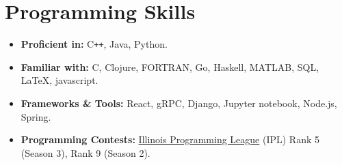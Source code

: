 \documentclass[11pt,a4paper,sans]{moderncv}        %
\begin{document}
\vspace{-5pt}
\section{Programming Skills}
\vspace{-5pt}
\begin{itemize}
	\item \textbf{Proficient in:}
	      C\texttt{++}, 
	      Java,
	      Python.
	\item \textbf{Familiar with:}
	      C,
	      Clojure,
	      FORTRAN,
	      Go,
	      Haskell,
	      MATLAB,
	      SQL,
	      \LaTeX,
	      javascript.
	\item \textbf{Frameworks \& Tools:}
	      React,
	      gRPC,
	      Django,
	      Jupyter notebook,
	      Node.js, 
	      Spring.
	\item \textbf{Programming Contests:}
	      \href{https://icpc.cs.illinois.edu/halloffame.html}{Illinois Programming League} (IPL) Rank 5 (Season 3), Rank 9 (Season 2).
\end{itemize}

% 
% 
\end{document}
